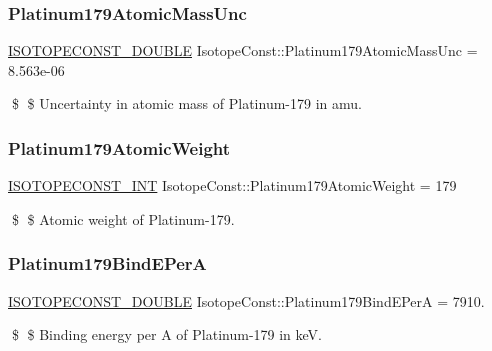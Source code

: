 \subsubsection{\texorpdfstring{Platinum179\+Atomic\+Mass\+Unc}{Platinum179AtomicMassUnc}}
{\footnotesize\ttfamily \mbox{\hyperlink{group___isotope_const-_macros_ga8f45a7272ce02c0b4c65c44636ed719a}{I\+S\+O\+T\+O\+P\+E\+C\+O\+N\+S\+T\+\_\+\+D\+O\+U\+B\+LE}} Isotope\+Const\+::\+Platinum179\+Atomic\+Mass\+Unc = 8.\+563e-\/06}

\$ \$ Uncertainty in atomic mass of Platinum-\/179 in amu. \mbox{\label{group___isotope_const-_platinum-_pt179_gaf1faf2c58c6edc4e79d2dc15d4fde8b4}} 
\subsubsection{\texorpdfstring{Platinum179\+Atomic\+Weight}{Platinum179AtomicWeight}}
{\footnotesize\ttfamily \mbox{\hyperlink{group___isotope_const-_macros_ga5f18360b3e99483a35c32d789e62621c}{I\+S\+O\+T\+O\+P\+E\+C\+O\+N\+S\+T\+\_\+\+I\+NT}} Isotope\+Const\+::\+Platinum179\+Atomic\+Weight = 179}

\$ \$ Atomic weight of Platinum-\/179. \mbox{\label{group___isotope_const-_platinum-_pt179_ga6cec8fe07155d9b53fbef85fb9a18a99}} 
\subsubsection{\texorpdfstring{Platinum179\+Bind\+E\+PerA}{Platinum179BindEPerA}}
{\footnotesize\ttfamily \mbox{\hyperlink{group___isotope_const-_macros_ga8f45a7272ce02c0b4c65c44636ed719a}{I\+S\+O\+T\+O\+P\+E\+C\+O\+N\+S\+T\+\_\+\+D\+O\+U\+B\+LE}} Isotope\+Const\+::\+Platinum179\+Bind\+E\+PerA = 7910.}

\$ \$ Binding energy per A of Platinum-\/179 in keV. \mbox{\label{group___isotope_const-_platinum-_pt179_ga1e3ae0d222738ee63d578bc30a68e73f}} 
